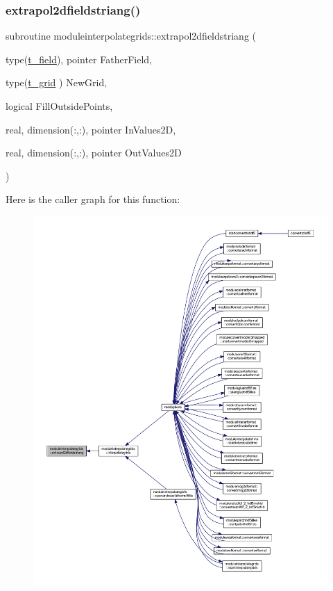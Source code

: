 \subsubsection{\texorpdfstring{extrapol2dfieldstriang()}{extrapol2dfieldstriang()}}
{\footnotesize\ttfamily subroutine moduleinterpolategrids\+::extrapol2dfieldstriang (\begin{DoxyParamCaption}\item[{type(\mbox{\hyperlink{structmoduleinterpolategrids_1_1t__field}{t\+\_\+field}}), pointer}]{Father\+Field,  }\item[{type(\mbox{\hyperlink{structmoduleinterpolategrids_1_1t__grid}{t\+\_\+grid}} )}]{New\+Grid,  }\item[{logical}]{Fill\+Outside\+Points,  }\item[{real, dimension(\+:,\+:), pointer}]{In\+Values2D,  }\item[{real, dimension(\+:,\+:), pointer}]{Out\+Values2D }\end{DoxyParamCaption})\hspace{0.3cm}{\ttfamily [private]}}

Here is the caller graph for this function\+:\nopagebreak
\begin{figure}[H]
\begin{center}
\leavevmode
\includegraphics[width=350pt]{namespacemoduleinterpolategrids_a20223d63f36c638cc63f14868772d148_icgraph}
\end{center}
\end{figure}
\mbox{\label{namespacemoduleinterpolategrids_a20e11038e33700a28ecb799dc0420e26}} 

